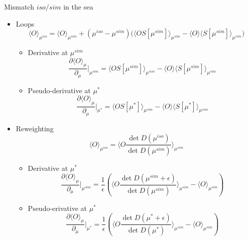 \documentclass[xcolor={dvipsnames,table}]{beamer}
\begin{document}
\begin{frame}{Mismatch $iso/sim$ in the sea}
  \begin{itemize}\setlength\itemsep{1em}
    \item<1-> Loops
          $$\langle O \rangle_{\mu^{iso}}  =\langle O \rangle_{\mu^{sim}} + (\mu^{iso}-\mu^{sim})
            \bigg(\langle O  S[\mu^{sim}]\rangle_{\mu^{sim}} - \langle O \rangle \langle S[\mu^{sim}]\rangle_{\mu^{sim}} \bigg)$$
          \vspace{1em}
          \begin{itemize}\setlength\itemsep{1em}
            \item<1-> Derivative at $\mu^{sim}$
                  $$
                    \frac{\partial \langle O \rangle_{\mu} }
                    { \partial_\mu } \bigg|_{\mu^{sim}}
                    =\langle O  S[\mu^{sim}]\rangle_{\mu^{sim}} - \langle O \rangle \langle S[\mu^{sim}]\rangle_{\mu^{sim}}
                  $$
            \item<2-> Pseudo-derivative at $\mu^{*}$
                  $$
                    \frac{\partial \langle O \rangle_{\mu} }
                    { \partial_\mu } \bigg|_{\mu^{*}}
                    =\langle O  S[\mu^{*}]\rangle_{\mu^{sim}} - \langle O \rangle \langle S[\mu^{*}]\rangle_{\mu^{sim}}
                  $$
          \end{itemize}
    \item<3-> Reweighting
          $$
            \langle O \rangle_{\mu^{iso}}   = \langle O  \frac{\det{D(\mu^{iso})}}{\det{D(\mu^{sim})}}\rangle_{\mu^{sim}}
          $$
          \begin{itemize}\setlength\itemsep{1em}
            \item<3-> Derivative at $\mu^*$
                  $$
                    \frac{\partial \langle O \rangle_{\mu} }
                    { \partial_\mu } \bigg|_{\mu^{sim}}
                    =\frac{1}{\epsilon}\left(\langle O  \frac{\det{D(\mu^{sim}+\epsilon)}}{\det{D(\mu^{sim})}}\rangle_{\mu^{sim}}  - \langle O \rangle_{\mu^{sim}}\right)
                  $$
            \item<4-> Pseudo-erivative at $\mu^*$
                  $$
                    \frac{\partial \langle O \rangle_{\mu} }
                    { \partial_\mu } \bigg|_{\mu^{*}}
                    =\frac{1}{\epsilon}\left(\langle O  \frac{\det{D(\mu^{*}+\epsilon)}}{\det{D(\mu^{*})}}\rangle_{\mu^{sim}}  - \langle O \rangle_{\mu^{sim}}\right)
                  $$
          \end{itemize}
  \end{itemize}
\end{frame}
\end{document}
